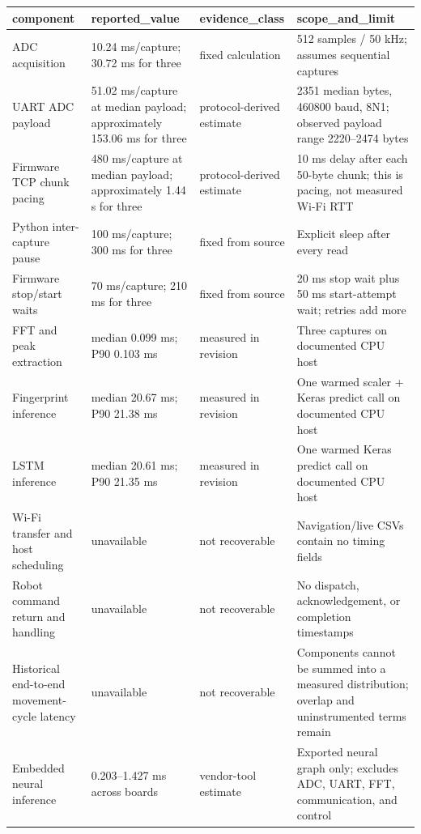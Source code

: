 \begin{tabular}{llll}
\toprule
component & reported\_value & evidence\_class & scope\_and\_limit \\
\midrule
ADC acquisition & 10.24 ms/capture; 30.72 ms for three & fixed calculation & 512 samples / 50 kHz; assumes sequential captures \\
UART ADC payload & 51.02 ms/capture at median payload; approximately 153.06 ms for three & protocol-derived estimate & 2351 median bytes, 460800 baud, 8N1; observed payload range 2220--2474 bytes \\
Firmware TCP chunk pacing & 480 ms/capture at median payload; approximately 1.44 s for three & protocol-derived estimate & 10 ms delay after each 50-byte chunk; this is pacing, not measured Wi-Fi RTT \\
Python inter-capture pause & 100 ms/capture; 300 ms for three & fixed from source & Explicit sleep after every read \\
Firmware stop/start waits & 70 ms/capture; 210 ms for three & fixed from source & 20 ms stop wait plus 50 ms start-attempt wait; retries add more \\
FFT and peak extraction & median 0.099 ms; P90 0.103 ms & measured in revision & Three captures on documented CPU host \\
Fingerprint inference & median 20.67 ms; P90 21.38 ms & measured in revision & One warmed scaler + Keras predict call on documented CPU host \\
LSTM inference & median 20.61 ms; P90 21.35 ms & measured in revision & One warmed Keras predict call on documented CPU host \\
Wi-Fi transfer and host scheduling & unavailable & not recoverable & Navigation/live CSVs contain no timing fields \\
Robot command return and handling & unavailable & not recoverable & No dispatch, acknowledgement, or completion timestamps \\
Historical end-to-end movement-cycle latency & unavailable & not recoverable & Components cannot be summed into a measured distribution; overlap and uninstrumented terms remain \\
Embedded neural inference & 0.203--1.427 ms across boards & vendor-tool estimate & Exported neural graph only; excludes ADC, UART, FFT, communication, and control \\
\bottomrule
\end{tabular}
